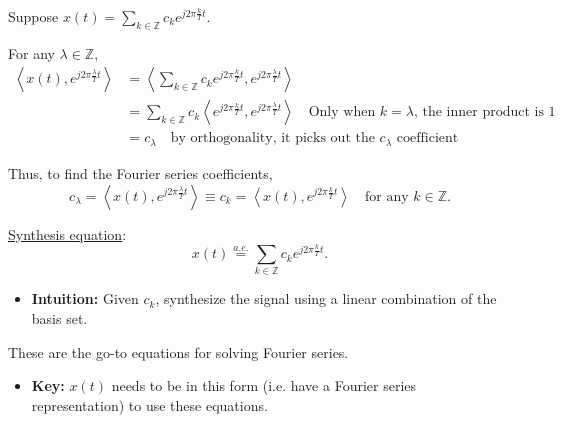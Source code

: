\begin{derivation}
    Suppose $x(t) = \sum_{k \in \mathbb{Z}} c_k e^{j 2\pi \frac{k}{T} t}$.

    For any $\lambda \in \mathbb{Z}$,
    \begin{align*}
        \left\langle x(t), e^{j 2\pi \frac{\lambda}{T} t} \right\rangle &= \left\langle \sum_{k \in \mathbb{Z}} c_k e^{j 2\pi \frac{k}{T} t}, e^{j 2\pi \frac{\lambda}{T} t} \right\rangle \\
        &= \sum_{k \in \mathbb{Z}} c_k \left\langle e^{j 2\pi \frac{k}{T} t}, e^{j 2\pi \frac{\lambda}{T} t} \right\rangle \quad \text{Only when $k=\lambda$, the inner product is 1}\\
        &= c_\lambda \quad \text{by orthogonality, it picks out the $c_\lambda$ coefficient}
    \end{align*}

    Thus, to find the Fourier series coefficients,
    \[
    c_\lambda = \left\langle x(t), e^{j 2\pi \frac{\lambda}{T} t} \right\rangle \equiv c_k = \left\langle x(t), e^{j 2\pi \frac{k}{T} t} \right\rangle \quad \text{for any } k \in \mathbb{Z}.
    \]
\end{derivation}

\begin{definition}
    \underline{Synthesis equation}:
    \[
    x(t) \overset{a.e.}{=} \sum_{k \in \mathbb{Z}} c_k e^{j 2\pi \frac{k}{T} t}.
    \]
    \begin{itemize}
        \item \textbf{Intuition:} Given $c_k$, synthesize the signal using a linear combination of the basis set. 
    \end{itemize}
\end{definition}

\begin{warning}
    These are the go-to equations for solving Fourier series. 
    \begin{itemize}
        \item \textbf{Key:} $x(t)$ needs to be in this form (i.e. have a Fourier series representation) to use these equations. 
    \end{itemize}
\end{warning}

